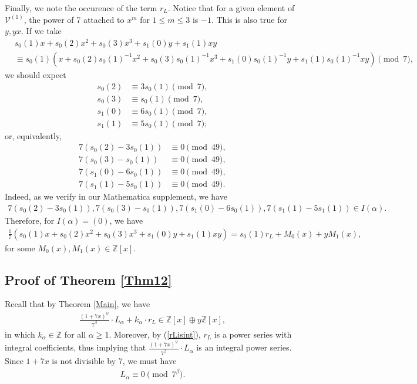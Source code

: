 \documentclass[reqno]{amsart}
\theoremstyle{definition}
\theoremstyle{remark}
\numberwithin{equation}{section}
\begin{document}
Finally, we note the occurence of the term $r_L$.  Notice that for a given element of $\mathcal{V}^{(1)}$, the power of 7 attached to $x^m$ for $1\le m\le 3$ is $-1$.  This is also true for $y, yx$.  If we take 
\begin{align*}
&s_0(1)x+s_0(2)x^2+s_0(3)x^3+s_1(0)y+s_1(1)xy\\
&\equiv s_0(1)\left(x+s_0(2)s_0(1)^{-1}x^2+s_0(3)s_0(1)^{-1}x^3+s_1(0)s_0(1)^{-1}y+s_1(1)s_0(1)^{-1}xy \right)\pmod{7},
\end{align*} we should expect
\begin{align*}
s_0(2)&\equiv 3s_0(1)\pmod{7},\\
s_0(3)&\equiv s_0(1)\pmod{7},\\
s_1(0)&\equiv 6s_0(1)\pmod{7},\\
s_1(1)&\equiv 5s_0(1)\pmod{7};
\end{align*} or, equivalently,
\begin{align*}
7(s_0(2)- 3s_0(1))&\equiv 0\pmod{49},\\
7(s_0(3)- s_0(1))&\equiv 0\pmod{49},\\
7(s_1(0)- 6s_0(1))&\equiv 0\pmod{49},\\
7(s_1(1)- 5s_0(1))&\equiv 0\pmod{49}.
\end{align*}  Indeed, as we verify in our Mathematica supplement, we have
\begin{align*}
7(s_0(2) - 3s_0(1)), 7(s_0(3) - s_0(1)), 7(s_1(0) - 6s_0(1)), 7(s_1(1) - 5s_1(1))\in I(\alpha).
\end{align*}  Therefore, for $I(\alpha)=(0)$, we have
\begin{align*}
\frac{1}{7}(s_0(1)x+s_0(2)x^2+s_0(3)x^3+s_1(0)y+s_1(1)xy) = s_0(1)r_L + M_0(x)+yM_1(x),
\end{align*} for some $M_0(x), M_1(x)\in\mathbb{Z}[x].$ \begin{flushright}\qedsymbol\end{flushright}

\subsection{Proof of Theorem \ref{Thm12}}

Recall that by Theorem \ref{Main}, we have
\begin{align*}
\frac{(1+7x)^{\psi}}{7^{\beta}}\cdot L_{\alpha} + k_{\alpha}\cdot r_L \in\mathbb{Z}[x]\oplus y\mathbb{Z}[x],
\end{align*} in which $k_{\alpha}\in\mathbb{Z}$ for all $\alpha\ge 1$.  Moreover, by (\ref{rLisint}), $r_L$ is a power series with integral coefficients, thus implying that $\frac{(1+7x)^{\psi}}{7^{\beta}}\cdot L_{\alpha}$ is an integral power series.  Since $1+7x$ is not divisible by 7, we must have
\begin{align*}
L_{\alpha}\equiv 0\pmod {7^{\beta}}.
\end{align*}
\begin{flushright}\qedsymbol\end{flushright}
\end{document}
